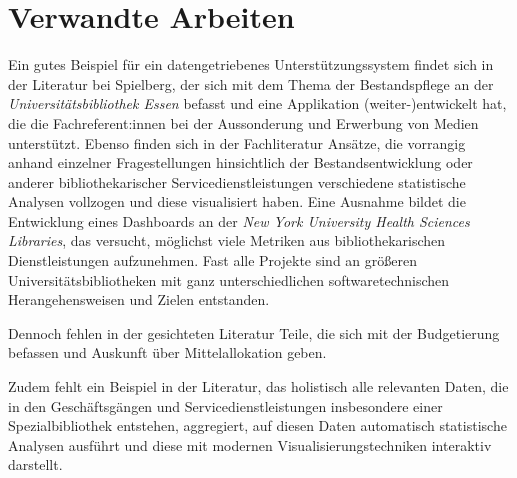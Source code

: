 



\section{Verwandte Arbeiten}


Ein gutes Beispiel für ein datengetriebenes Unterstützungssystem findet sich in
der Literatur bei Spielberg, der sich mit dem Thema der Bestandspflege an der
\textit{Universitätsbibliothek Essen} befasst und eine Applikation (weiter-)entwickelt hat, die
die Fachreferent:innen bei der Aussonderung und Erwerbung von Medien
unterstützt.\cite{spielberg_eike_t_fachref-assistent_nodate}
Ebenso finden sich in der Fachliteratur Ansätze, die vorrangig anhand einzelner
Fragestellungen hinsichtlich der Bestandsentwicklung\cite{hughes_long-term_2016} oder anderer
bibliothekarischer Servicedienstleistungen\cite{kutlay_shiny_2020, knievel_use_2006,meyer_using_2018} verschiedene statistische Analysen
vollzogen und diese visualisiert haben.
Eine Ausnahme bildet die Entwicklung eines Dashboards an der \textit{New York
University Health Sciences Libraries}, das versucht, möglichst viele Metriken
aus bibliothekarischen Dienstleistungen aufzunehmen.\cite{morton-owens_trends_2012}
Fast alle Projekte sind an größeren
Universitätsbibliotheken mit ganz unterschiedlichen softwaretechnischen
Herangehensweisen\cite{finch_using_2016, wiegand_visualizing_2013} und Zielen\cite{phetteplace_effectively_2012} entstanden.

Dennoch fehlen in der gesichteten Literatur Teile, die sich mit der Budgetierung
befassen und Auskunft über Mittelallokation geben.

Zudem fehlt ein Beispiel in der Literatur, das holistisch alle relevanten Daten, die in den
Geschäftsgängen und Servicedienstleistungen insbesondere einer Spezialbibliothek entstehen,
aggregiert, auf diesen Daten automatisch statistische Analysen ausführt und diese mit modernen Visualisierungstechniken
interaktiv darstellt.

